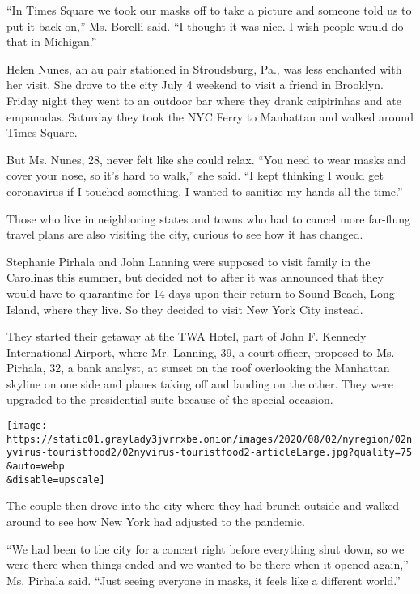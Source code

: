 ``In Times Square we took our masks off to take a picture and someone
told us to put it back on,'' Ms. Borelli said. ``I thought it was nice.
I wish people would do that in Michigan.''

Helen Nunes, an au pair stationed in Stroudsburg, Pa., was less
enchanted with her visit. She drove to the city July 4 weekend to visit
a friend in Brooklyn. Friday night they went to an outdoor bar where
they drank caipirinhas and ate empanadas. Saturday they took the NYC
Ferry to Manhattan and walked around Times Square.

But Ms. Nunes, 28, never felt like she could relax. ``You need to wear
masks and cover your nose, so it's hard to walk,'' she said. ``I kept
thinking I would get coronavirus if I touched something. I wanted to
sanitize my hands all the time.''

Those who live in neighboring states and towns who had to cancel more
far-flung travel plans are also visiting the city, curious to see how it
has changed.

Stephanie Pirhala and John Lanning were supposed to visit family in the
Carolinas this summer, but decided not to after it was announced that
they would have to quarantine for 14 days upon their return to Sound
Beach, Long Island, where they live. So they decided to visit New York
City instead.

They started their getaway at the TWA Hotel, part of John F. Kennedy
International Airport, where Mr. Lanning, 39, a court officer, proposed
to Ms. Pirhala, 32, a bank analyst, at sunset on the roof overlooking
the Manhattan skyline on one side and planes taking off and landing on
the other. They were upgraded to the presidential suite because of the
special occasion.

\texttt{[image: https://static01.graylady3jvrrxbe.onion/images/2020/08/02/nyregion/02nyvirus-touristfood2/02nyvirus-touristfood2-articleLarge.jpg?quality=75\\\&auto=webp\\\&disable=upscale]}

The couple then drove into the city where they had brunch outside and
walked around to see how New York had adjusted to the pandemic.

``We had been to the city for a concert right before everything shut
down, so we were there when things ended and we wanted to be there when
it opened again,'' Ms. Pirhala said. ``Just seeing everyone in masks, it
feels like a different world.''

\href{https://www.nytimes3xbfgragh.onion/news-event/coronavirus?action=click\&pgtype=Article\&state=default\&region=MAIN_CONTENT_3\&context=storylines_faq}{}

